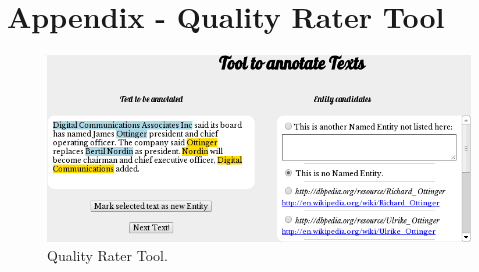 \documentclass[11pt,letterpaper]{article}
\begin{document}
\section*{Appendix - Quality Rater Tool}

\begin{figure}[htb!]    
    \centering  
         \includegraphics[width=\linewidth]{fig/qrtoolnew.png}
    \caption{Quality Rater Tool.} 
\end{figure}
\end{document}
